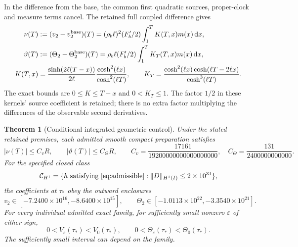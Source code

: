 \documentclass[11pt]{article}
\newcommand{\eps}{\varepsilon}
\newcommand{\dd}{\mathrm d}
\newcommand{\norm}[1]{\lVert #1\rVert}
\newtheorem{theorem}{Theorem}
\begin{document}
In the difference from the base, the common first quadratic sources,
proper-clock and measure terms cancel. The retained full coupled
difference gives
\begin{align}
 \nu(T)&:=(v_2-v_2^{\rm base})(T)
   =(\rho_b\ell)^2(F'_b/2)\int_1^T K(T,x)m(x)\,\dd x,\nonumber\\
 \vartheta(T)&:=(\Theta_2-\Theta_2^{\rm base})(T)
   =\rho_b\ell(F'_b/2)\int_1^T K_T(T,x)m(x)\,\dd x,\nonumber\\
 K(T,x)&=\frac{\sinh(2\ell(T-x))}{2\ell}
                       \frac{\cosh^2(\ell x)}{\cosh^2(\ell T)},\qquad
 K_T=\frac{\cosh^2(\ell x)\cosh(\ell T-2\ell x)}{\cosh^3(\ell T)}.
 \label{eq:kernels}
\end{align}
The exact bounds are $0\le K\le T-x$ and $0<K_T\le1$.
The factor $1/2$ in these kernels' source coefficient is retained; there
is no extra factor multiplying the differences of the observable second
derivatives.

\begin{theorem}[Conditional integrated geometric control]\label{thm:main}
Under the stated retained premises, each admitted smooth compact
preparation satisfies
\begin{equation}
 |\nu(T)|\le C_vR,\qquad |\vartheta(T)|\le C_\Theta R,\qquad
 C_v=\frac{17161}{19200000000000000000},\quad
 C_\Theta=\frac{131}{2400000000000}.
 \label{eq:transfer}
\end{equation}
For the specified closed class
\begin{equation}
 \mathcal C_{H^1}=\{h\text{ satisfying \eqref{eq:admissible}}:
                         \norm D_{H^1(I)}\le2\times10^{31}\},
 \label{eq:class}
\end{equation}
the coefficients at $\tau_*$ obey the outward enclosures
\begin{equation}
 v_2\in[-7.2400\times10^{16},-8.6400\times10^{15}],\qquad
 \Theta_2\in[-1.0113\times10^{22},-3.3540\times10^{21}].
 \label{eq:signs}
\end{equation}
For every individual admitted exact family, for sufficiently small
nonzero $\eps$ of either sign,
\begin{equation}
 0<V_\eps(\tau_*)<V_0(\tau_*),\qquad
 0<\Theta_\eps(\tau_*)<\Theta_0(\tau_*).
 \label{eq:nonlinear}
\end{equation}
The sufficiently small interval can depend on the family.
\end{theorem}
\end{document}
